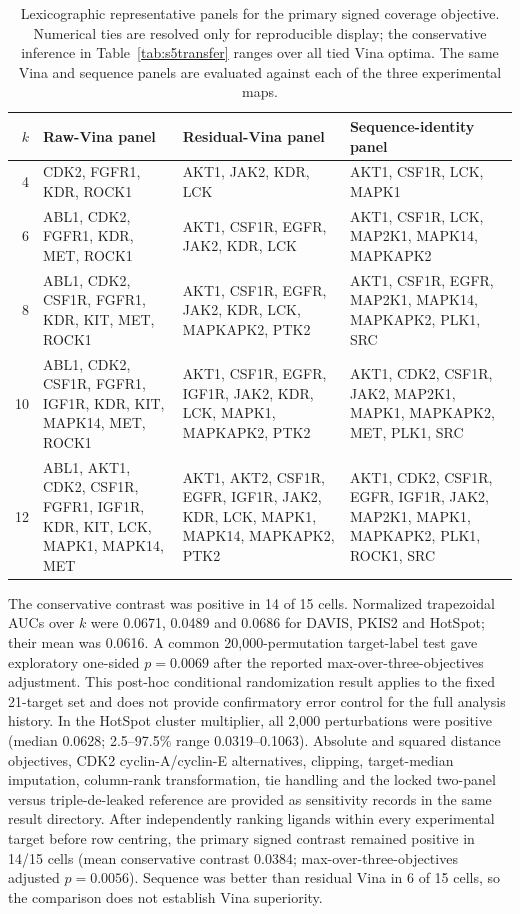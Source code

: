 \documentclass[11pt]{article}
\begin{document}
\begin{table}[htbp]
\centering
\caption{Lexicographic representative panels for the primary signed coverage
objective. Numerical ties are resolved only for reproducible display; the
conservative inference in Table~\ref{tab:s5transfer} ranges over all tied Vina
optima. The same Vina and sequence panels are evaluated against each of the
three experimental maps.}
\label{tab:s5panels}
\scriptsize
\setlength{\tabcolsep}{3pt}
\begin{tabular}{rp{}p{}p{}}
\toprule
$k$ & Raw-Vina panel & Residual-Vina panel & Sequence-identity panel \\
\midrule
4 & CDK2, FGFR1, KDR, ROCK1 &
AKT1, JAK2, KDR, LCK &
AKT1, CSF1R, LCK, MAPK1 \\
6 & ABL1, CDK2, FGFR1, KDR, MET, ROCK1 &
AKT1, CSF1R, EGFR, JAK2, KDR, LCK &
AKT1, CSF1R, LCK, MAP2K1, MAPK14, MAPKAPK2 \\
8 & ABL1, CDK2, CSF1R, FGFR1, KDR, KIT, MET, ROCK1 &
AKT1, CSF1R, EGFR, JAK2, KDR, LCK, MAPKAPK2, PTK2 &
AKT1, CSF1R, EGFR, MAP2K1, MAPK14, MAPKAPK2, PLK1, SRC \\
10 & ABL1, CDK2, CSF1R, FGFR1, IGF1R, KDR, KIT, MAPK14, MET, ROCK1 &
AKT1, CSF1R, EGFR, IGF1R, JAK2, KDR, LCK, MAPK1, MAPKAPK2, PTK2 &
AKT1, CDK2, CSF1R, JAK2, MAP2K1, MAPK1, MAPKAPK2, MET, PLK1, SRC \\
12 & ABL1, AKT1, CDK2, CSF1R, FGFR1, IGF1R, KDR, KIT, LCK, MAPK1, MAPK14, MET &
AKT1, AKT2, CSF1R, EGFR, IGF1R, JAK2, KDR, LCK, MAPK1, MAPK14, MAPKAPK2, PTK2 &
AKT1, CDK2, CSF1R, EGFR, IGF1R, JAK2, MAP2K1, MAPK1, MAPKAPK2, PLK1, ROCK1, SRC \\
\bottomrule
\end{tabular}
\end{table}

The conservative contrast was positive in 14 of 15 cells. Normalized
trapezoidal AUCs over $k$ were 0.0671, 0.0489 and 0.0686 for DAVIS, PKIS2 and
HotSpot; their mean was 0.0616. A common 20,000-permutation target-label test
gave exploratory one-sided $p=0.0069$ after the reported
max-over-three-objectives adjustment. This post-hoc conditional randomization
result applies to the fixed 21-target set and does not provide confirmatory
error control for the full analysis history. In the HotSpot cluster multiplier,
all 2,000 perturbations were
positive (median 0.0628; 2.5--97.5\% range 0.0319--0.1063). Absolute and squared
distance objectives, CDK2 cyclin-A/cyclin-E alternatives, clipping,
target-median imputation, column-rank transformation, tie handling and the
locked two-panel versus triple-de-leaked reference are provided as sensitivity
records in the same result directory. After independently ranking ligands
within every experimental target before row centring, the primary signed
contrast remained positive in 14/15 cells (mean conservative contrast 0.0384;
max-over-three-objectives adjusted $p=0.0056$). Sequence was better than residual Vina
in 6 of 15 cells, so the comparison does not establish Vina superiority.
\end{document}
